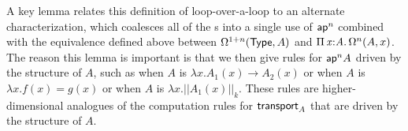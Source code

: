 A key lemma relates this definition of loop-over-a-loop to an alternate
characterization, which coalesces all of the s into a
single use of $\mathsf{ap}^n$ combined with the equivalence defined above
between $\Omega^{1+n}(\mathsf{Type},A)$ and $\textnormal{$\Pi$}\,\mathit{x} \mathit{:} \mathit{A}.\,\mathit{} \Omega^n(A, x)$.  
The reason this lemma is important is that we then give rules for
$\mathsf{ap}^n A$ driven by the structure of $A$, such as when $A$
is $\lambda x.A_1(x) \to A_2(x)$ or when $A$ is $\lambda x.f(x) = g(x)$
or when $A$ is $\lambda x.||A_1(x)||_k$.  These rules are
higher-dimensional analogues of the computation rules for
$\mathsf{transport}_A$ that are driven by the structure of $A$.  

